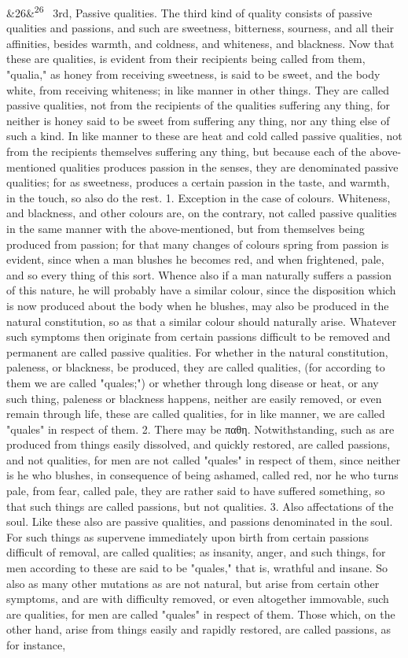 \documentclass[12pt]{article}
\newcommand{\para}[1][]{\par\noindent\ifx&#1&\else\textsuperscript{\footnotesize #1}~\fi}
\begin{document}
\para[26] 3rd, Passive qualities. The third kind of quality consists of passive qualities and passions, and such are sweetness, bitterness, sourness, and all their affinities, besides warmth, and coldness, and whiteness, and blackness. Now that these are qualities, is evident from their recipients being called from them, "qualia," as honey from receiving sweetness, is said to be sweet, and the body white, from receiving whiteness; in like manner in other things. They are called passive qualities, not from the recipients of the qualities suffering any thing, for neither is honey said to be sweet from suffering any thing, nor any thing else of such a kind. In like manner to these are heat and cold called passive qualities, not from the recipients themselves suffering any thing, but because each of the above-mentioned qualities produces passion in the senses, they are denominated passive qualities; for as sweetness, produces a certain passion in the taste, and warmth, in the touch, so also do the rest. 1. Exception in the case of colours. Whiteness, and blackness, and other colours are, on the contrary, not called passive qualities in the same manner with the above-mentioned, but from themselves being produced from passion; for that many changes of colours spring from passion is evident, since when a man blushes he becomes red, and when frightened, pale, and so every thing of this sort. Whence also if a man naturally suffers a passion of this nature, he will probably have a similar colour, since the disposition which is now produced about the body when he blushes, may also be produced in the natural constitution, so as that a similar colour should naturally arise. Whatever such symptoms then originate from certain passions difficult to be removed and permanent are called passive qualities. For whether in the natural constitution, paleness, or blackness, be produced, they are called qualities, (for according to them we are called "quales;") or whether through long disease or heat, or any such thing, paleness or blackness happens, neither are easily removed, or even remain through life, these are called qualities, for in like manner, we are called "quales" in respect of them. 2. There may be παθη. Notwithstanding, such as are produced from things easily dissolved, and quickly restored, are called passions, and not qualities, for men are not called "quales" in respect of them, since neither is he who blushes, in consequence of being ashamed, called red, nor he who turns pale, from fear, called pale, they are rather said to have suffered something, so that such things are called passions, but not qualities. 3. Also affectations of the soul. Like these also are passive qualities, and passions denominated in the soul. For such things as supervene immediately upon birth from certain passions difficult of removal, are called qualities; as insanity, anger, and such things, for men according to these are said to be "quales," that is, wrathful and insane. So also as many other mutations as are not natural, but arise from certain other symptoms, and are with difficulty removed, or even altogether immovable, such are qualities, for men are called "quales" in respect of them. Those which, on the other hand, arise from things easily and rapidly restored, are called passions, as for instance, 
\end{document}

